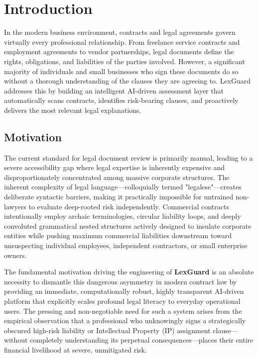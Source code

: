 \documentclass[a4paper,12pt]{report}
\begin{document}
\newpage
{}
\pagestyle{fancy}
\fancyhf{}
\fancyfoot[C]{\small\thepage}
\renewcommand{\headrulewidth}{0.4pt}
\renewcommand{\footrulewidth}{0.4pt}

\chapter{Introduction}

In the modern business environment, contracts and legal agreements govern virtually every professional relationship. From freelance service contracts and employment agreements to vendor partnerships, legal documents define the rights, obligations, and liabilities of the parties involved. However, a significant majority of individuals and small businesses who sign these documents do so without a thorough understanding of the clauses they are agreeing to. LexGuard addresses this by building an intelligent AI-driven assessment layer that automatically scans contracts, identifies risk-bearing clauses, and proactively delivers the most relevant legal explanations.

\section{Motivation}

The current standard for legal document review is primarily manual, leading to a severe accessibility gap where legal expertise is inherently expensive and disproportionately concentrated among massive corporate structures. The inherent complexity of legal language—colloquially termed "legalese"—creates deliberate syntactic barriers, making it practically impossible for untrained non-lawyers to evaluate deep-rooted risk independently. Commercial contracts intentionally employ archaic terminologies, circular liability loops, and deeply convoluted grammatical nested structures actively designed to insulate corporate entities while pushing maximum commercial liabilities downstream toward unsuspecting individual employees, independent contractors, or small enterprise owners. 

The fundamental motivation driving the engineering of \textbf{LexGuard} is an absolute necessity to dismantle this dangerous asymmetry in modern contract law by providing an immediate, computationally robust, highly transparent AI-driven platform that explicitly scales profound legal literacy to everyday operational users. The pressing and non-negotiable need for such a system arises from the empirical observation that a professional who unknowingly signs a strategically obscured high-risk liability or Intellectual Property (IP) assignment clause—without completely understanding its perpetual consequences—places their entire financial livelihood at severe, unmitigated risk. 
\end{document}
